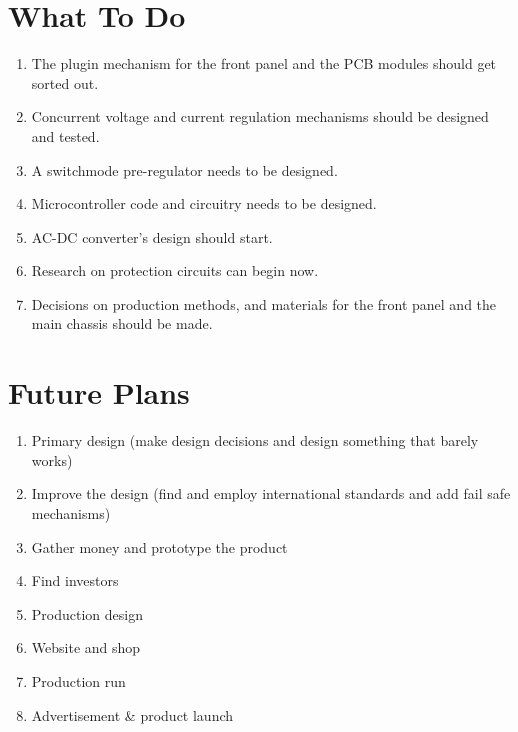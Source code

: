 \documentclass[a4paper, twocolumn]{article}
\begin{document}
\section*{What To Do}
	\begin{enumerate}
		\item The plugin mechanism for the front panel and the PCB modules should get sorted out.
		\item Concurrent voltage and current regulation mechanisms should be designed and tested.
		\item A switchmode pre-regulator needs to be designed.
		\item Microcontroller code and circuitry needs to be designed.
		\item AC-DC converter's design should start.
		\item Research on protection circuits can begin now.
		\item Decisions on production methods, and materials for the front panel and the main chassis should be made.
		
	\end{enumerate}

	
	
\section*{Future Plans}
	\begin{enumerate}
	
		\item Primary design (make design decisions and design something that barely works)
	
		\item Improve the design (find and employ international standards and add fail safe mechanisms)
	
		\item Gather money and prototype the product
	
		\item Find investors
	
		\item Production design
	
		\item Website and shop
	
		\item Production run
	
		\item Advertisement \& product launch

	\end{enumerate}
\end{document}
